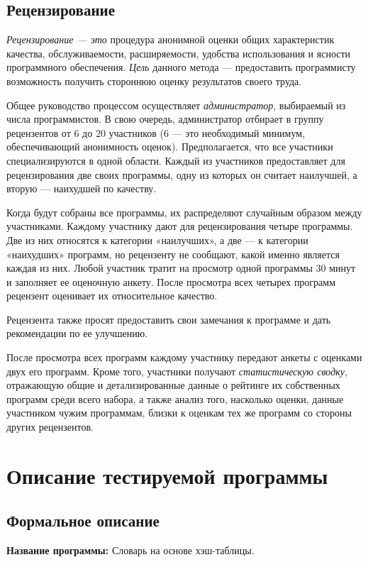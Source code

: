 \documentclass[11pt,a4paper,final]{article} %
\begin{document}
\subsection{Рецензирование}
\textit{Рецензирование — это} процедура анонимной оценки общих характеристик качества, обслуживаемости, расширяемости, удобства использования и ясности программного обеспечения. \textit{Цель} данного метода — предоставить программисту возможность получить стороннюю оценку результатов своего труда.

Общее руководство процессом осуществляет \textit{администратор}, выбираемый из числа программистов. В свою очередь, администратор отбирает в группу рецензентов от 6 до 20 участников (6 — это необходимый минимум, обеспечивающий анонимность оценок). Предполагается, что все участники специализируются в одной области. Каждый из участников предоставляет для рецензирования две своих программы, одну из которых он считает наилучшей, а вторую — наихудшей по качеству.

Когда будут собраны все программы, их распределяют случайным образом между участниками. Каждому участнику дают для рецензирования четыре программы. Две из них относятся к категории «наилучших», а две — к категории «наихудших» программ, но рецензенту не сообщают, какой именно является каждая из них. Любой участник тратит на просмотр одной программы 30 минут и заполняет ее оценочную анкету. После просмотра всех четырех программ рецензент оценивает их относительное качество.

Рецензента также просят предоставить свои замечания к программе и дать рекомендации по ее улучшению.

После просмотра всех программ каждому участнику передают анкеты с оценками двух его программ. Кроме того, участники получают \textit{статистическую сводку}, отражающую общие и детализированные данные о рейтинге их собственных программ среди всего набора, а также анализ того, насколько оценки, данные участником чужим программам, близки к оценкам тех же программ со стороны других рецензентов.


\newpage
\section{Описание тестируемой программы}

\subsection{Формальное описание}
\textbf{Название программы:} Словарь на основе хэш-таблицы.
\end{document}
